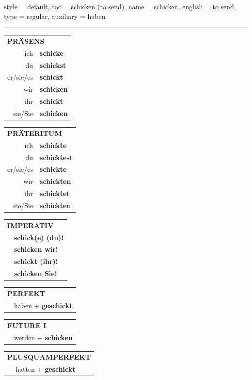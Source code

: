 \begin{verbentry}{
  style = {default},
  toc = {schicken (to send)},
  name = {schicken},
  english = {to send},
  type = {regular},
  auxiliary = {haben}
}


\vspace{5pt}
\hrule
\vspace{5pt}

\begin{tabular}{rl}
\multicolumn{2}{l}{\textbf{PRÄSENS}}\\
ich & \textbf{schicke}\\
du & \textbf{schickst}\\
er/sie/es & \textbf{schickt}\\
wir & \textbf{schicken}\\
ihr & \textbf{schickt}\\
sie/Sie & \textbf{schicken}\\
\end{tabular}
\hfill
\begin{tabular}{rl}
\multicolumn{2}{l}{\textbf{PRÄTERITUM}}\\
ich & \textbf{schickte}\\
du & \textbf{schicktest}\\
er/sie/es & \textbf{schickte}\\
wir & \textbf{schickten}\\
ihr & \textbf{schicktet}\\
sie/Sie & \textbf{schickten}\\
\end{tabular}
\hfill
\begin{tabular}{rl}
\multicolumn{2}{l}{\textbf{IMPERATIV}}\\
& \textbf{schick(e) (du)!}\\
& \textbf{schicken wir!}\\
& \textbf{schickt (ihr)!}\\
& \textbf{schicken Sie!}\\
\end{tabular}

\vspace{10pt}

\begin{tabular}{rl}
\multicolumn{2}{l}{\textbf{PERFEKT}}\\
& haben + \textbf{geschickt}\\
\end{tabular}
\hfill
\begin{tabular}{rl}
\multicolumn{2}{l}{\textbf{FUTURE I}}\\
& werden + \textbf{schicken}\\
\end{tabular}
\hfill
\begin{tabular}{rl}
\multicolumn{2}{l}{\textbf{PLUSQUAMPERFEKT}}\\
& hatten + \textbf{geschickt}\\
\end{tabular}


\end{verbentry}
